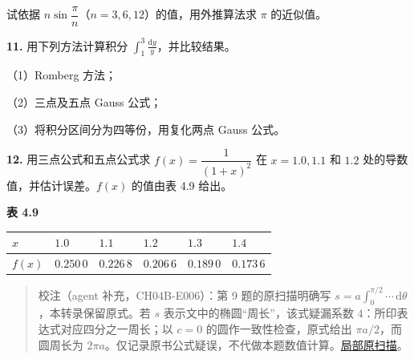 \documentclass[
  10pt,
  fontset=fandol]{ctexart}
\newcounter{none} %
\begin{document}
试依据 \(n\sin\dfrac\pi n\)（\(n=3,6,12\)）的值，用外推算法求 \(\pi\) 的近似值。

\textbf{11.} 用下列方法计算积分 \(\displaystyle\int_1^3\frac{\mathrm{d}y}{y}\)，并比较结果。

（1）Romberg 方法；

（2）三点及五点 Gauss 公式；

（3）将积分区间分为四等份，用复化两点 Gauss 公式。

\textbf{12.} 用三点公式和五点公式求 \(f(x)=\dfrac1{(1+x)^2}\) 在 \(x=1.0,1.1\) 和 \(1.2\) 处的导数值，并估计误差。\(f(x)\) 的值由表 4.9 给出。

\textbf{表 4.9}

{\def\LTcaptype{none} %
\begin{longtable}[]{@{}
  >{\centering\arraybackslash}p{}
  >{\centering\arraybackslash}p{}
  >{\centering\arraybackslash}p{}
  >{\centering\arraybackslash}p{}
  >{\centering\arraybackslash}p{}
  >{\centering\arraybackslash}p{}@{}}
\toprule\noalign{}
\begin{minipage}[b]{\linewidth}\centering
\(x\)
\end{minipage} & \begin{minipage}[b]{\linewidth}\centering
\(1.0\)
\end{minipage} & \begin{minipage}[b]{\linewidth}\centering
\(1.1\)
\end{minipage} & \begin{minipage}[b]{\linewidth}\centering
\(1.2\)
\end{minipage} & \begin{minipage}[b]{\linewidth}\centering
\(1.3\)
\end{minipage} & \begin{minipage}[b]{\linewidth}\centering
\(1.4\)
\end{minipage} \\
\midrule\noalign{}
\endhead
\bottomrule\noalign{}
\endlastfoot
\(f(x)\) & \(0.250\,0\) & \(0.226\,8\) & \(0.206\,6\) & \(0.189\,0\) & \(0.173\,6\) \\
\end{longtable}
}

\begin{quote}
校注（agent 补充，CH04B-E006）：第 9 题的原扫描明确写 \(s=a\int_0^{\pi/2}\cdots\,\mathrm{d}\theta\)，本转录保留原式。若 \(s\) 表示文中的椭圆``周长''，该式疑漏系数 \(4\)：所印表达式对应四分之一周长；以 \(c=0\) 的圆作一致性检查，原式给出 \(\pi a/2\)，而圆周长为 \(2\pi a\)。仅记录原书公式疑误，不代做本题数值计算。\href{../assets/ch04b/review-p118-orbit.png}{局部原扫描}。
\end{quote}
\end{document}
